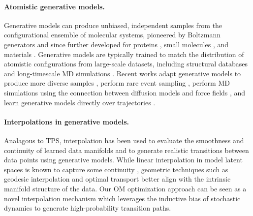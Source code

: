 \paragraph{Atomistic generative models.}
Generative models can produce unbiased, independent samples from the configurational ensemble of molecular systems, pioneered by Boltzmann generators \cite{noe2019boltzmann} and since further developed for proteins \cite{arts2023two, zheng2024predicting, jing2024alphafoldmeetsflowmatching, lewis2024scalable, schreiner2023implicit}, small molecules \cite{huang2024dual, schneuing2024structure,reidenbach2024coarsenconf,igashov2024equivariant}, and materials \cite{zeni2023mattergen, zheng2024predicting, xie2022crystal}. Generative models are typically trained to match the distribution of atomistic configurations from large-scale datasets, including structural databases \cite{bank1971protein} and long-timescale MD simulations \cite{lindorff2011fast, vander2024atlas}. Recent works adapt generative models to produce more diverse samples \cite{corso2023particle}, perform rare event sampling \cite{falkner2023conditioning}, perform MD simulations using the connection between diffusion models and force fields \cite{arts2023two}, and learn generative models directly over trajectories \cite{jing2024generative}.

\vspace{-7pt}
\paragraph{Interpolations in generative models.}
Analagous to TPS, interpolation has been used to evaluate the smoothness and continuity of learned data manifolds and to generate realistic transitions between data points using generative models. While linear interpolation in model latent spaces is known to capture some continuity \cite{kingma2013auto, goodfellow2014generative}, geometric techniques such as geodesic interpolation and optimal transport \cite{arjovsky2017wasserstein,arvanitidis2018latent, lesniak2018distribution, michelis2021linear, struski2023feature, psenka2024representation} better align with the intrinsic manifold structure of the data. Our OM optimization approach can be seen as a novel interpolation mechanism which leverages the inductive bias of stochastic dynamics to generate high-probability transition paths.
